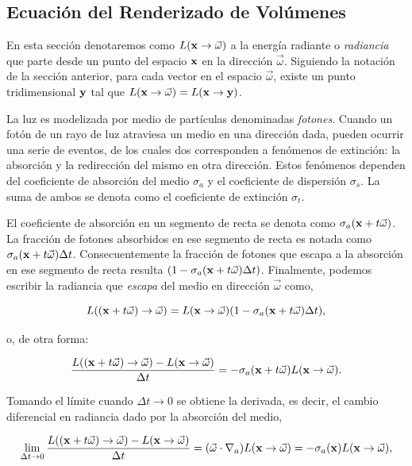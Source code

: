 \subsection{Ecuación del Renderizado de Volúmenes}

En esta sección denotaremos como $L(\bold{x} \rightarrow \vec{\omega})$ a la energía radiante o {\em radiancia} que parte desde un punto del espacio $\bold{x}$ en la dirección $\vec{\omega}$.
Siguiendo la notación de la sección anterior, para cada vector en el espacio $\vec{\omega}$, existe un punto tridimensional $\bold{y}$ tal que $L(\bold{x} \rightarrow \vec{\omega}) = L(\bold{x} \rightarrow \bold{y})$.

La luz es modelizada por medio de partículas denominadas {\em fotones}. Cuando un fotón de un rayo de luz atraviesa un medio en una dirección dada, pueden ocurrir una serie de eventos, de los cuales dos corresponden a fenómenos de extinción: la absorción y la redirección del mismo en otra dirección.
Estos fenómenos dependen del coeficiente de absorción del medio $\sigma_{a}$ y el coeficiente de dispersión $\sigma_{s}$.
La suma de ambos se denota como el coeficiente de extinción $\sigma_{t}$.

El coeficiente de absorción en un segmento de recta se denota como $\sigma_{a}(\bold{x} + t\vec{\omega})$.
La fracción de fotones absorbidos en ese segmento de recta es notada como $\sigma_{a}(\bold{x} + t\vec{\omega}) \Delta t$.
Consecuentemente la fracción de fotones que escapa a la absorción en ese segmento de recta resulta $(1-\sigma_{a}(\bold{x} + t\vec{\omega}) \Delta t)$.
Finalmente, podemos escribir la radiancia que {\em escapa} del medio en dirección $\vec{\omega}$ como,

$$L((\bold{x}+t\vec{\omega}) \rightarrow \vec{\omega}) = L(\bold{x} \rightarrow \vec{\omega}) (1-\sigma_{a}(\bold{x} + t\vec{\omega}) \Delta t),$$

o, de otra forma:

$$\frac{L((\bold{x}+t\vec{\omega}) \rightarrow \vec{\omega}) - L(\bold{x} \rightarrow \vec{\omega}) }{ \Delta t } = - \sigma_{a}(\bold{x} + t\vec{\omega}) L(\bold{x} \rightarrow \vec{\omega}).$$

Tomando el límite cuando $\Delta t \rightarrow 0$ se obtiene la derivada, es decir, el cambio diferencial en radiancia dado por la absorción del medio,

$$\lim_{\Delta t \rightarrow 0} \frac{L((\bold{x}+t\vec{\omega}) \rightarrow \vec{\omega}) - L(\bold{x} \rightarrow \vec{\omega}) }{ \Delta t } = (\vec{\omega} \cdot \nabla_{a}) L(\bold{x} \rightarrow \vec{\omega}) = - \sigma_{a}(\bold{x}) L(\bold{x} \rightarrow \vec{\omega}),$$

